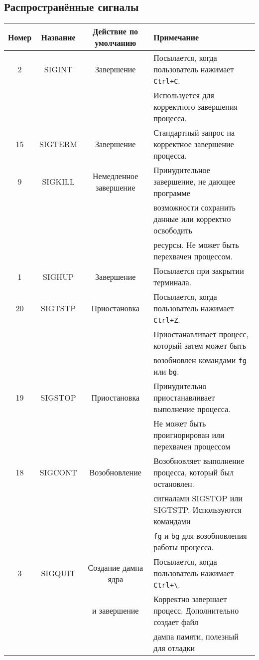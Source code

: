 \documentclass{article}
\begin{document}
\subsection*{Распространённые сигналы}
\begin{flushleft}
\begin{tabular}{ c | c | c | l }
Номер 	& Название 	& Действие по умолчанию  & Примечание\\ \hline
2		& SIGINT	& Завершение 			 & Посылается, когда пользователь нажимает \texttt{Ctrl+C}.\\
										 & & & Используется для корректного завершения процесса.\\ \hline
15		& SIGTERM	& Завершение 			 & Стандартный запрос на корректное завершение процесса.\\ \hline
9		& SIGKILL	& Немедленное завершение & Принудительное завершение, не дающее программе  \\
										 & & & возможности сохранить данные или корректно освободить  \\
										 & & & ресурсы. Не может быть перехвачен процессом.\\ \hline
1		& SIGHUP	& Завершение 			 & Посылается при закрытии терминала.\\ \hline
20		& SIGTSTP	& Приостановка 			 & Посылается, когда пользователь нажимает \texttt{Ctrl+Z}.\\
										 & & & Приостанавливает процесс, который затем может быть \\
										 & & & возобновлен командами \texttt{fg} или \texttt{bg}.\\ \hline
19		& SIGSTOP	& Приостановка 			 & Принудительно приостанавливает выполнение процесса.\\
										 & & & Не может быть проигнорирован или перехвачен процессом \\ \hline
18		& SIGCONT	& Возобновление 	     & Возобновляет выполнение процесса, который был остановлен.\\
										 & & & сигналами SIGSTOP или SIGTSTP. Используются командами \\
										 & & & \texttt{fg} и \texttt{bg} для возобновления работы процесса. \\ \hline
3		& SIGQUIT	& Создание дампа ядра 	 & Посылается, когда пользователь нажимает \texttt{Ctrl+\textbackslash}.\\
				    & &	и завершение	     & Корректно завершает процесс. Дополнительно создает файл \\ 
				                         & & & дампа памяти, полезный для отладки\\ \hline								
\end{tabular}
\end{flushleft}
\end{document}
